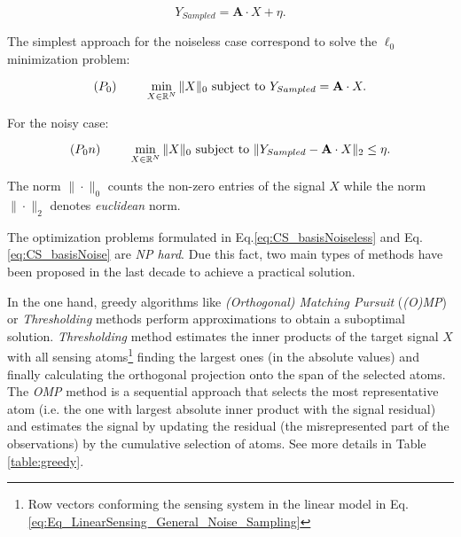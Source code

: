 \begin{equation}
\label{eq:Eq_LinearSensing_General_Noise_Sampling}
	Y_{Sampled} = \mathbf{A} \cdot X +  \eta .
\end{equation}

The simplest approach for the noiseless case correspond to solve the $\ell_0$ minimization problem: 

\begin{equation}
(P_0) \hspace{0.8cm} \min_{X \in \mathbb{R}^{N}} \|X\|_0 \mbox{ subject to } Y_{Sampled} = \mathbf{A} \cdot X .
\label{eq:CS_basisNoiseless}
\end{equation}


For the noisy case: 

\begin{equation}
(P_0n) \hspace{0.8cm} \min_{X \in \mathbb{R}^{N}} \|X\|_0 \mbox{ subject to } \|Y_{Sampled}-\mathbf{A} \cdot X\|_2\leq \eta .
\label{eq:CS_basisNoise}
\end{equation}

The norm $\|\cdot\|_0$ counts the non-zero entries of the signal $X$ while the norm $\|\cdot\|_2$ denotes \emph{euclidean} norm.

The optimization problems formulated in Eq.\eqref{eq:CS_basisNoiseless} and Eq.\eqref{eq:CS_basisNoise} are \emph{NP hard}. Due this fact, two main types of methods have been proposed in the last decade to achieve a practical solution.

In the one hand, greedy algorithms like \emph{(Orthogonal) Matching Pursuit} (\emph{(O)MP}) or \emph{Thresholding} methods perform approximations to obtain a suboptimal solution. \emph{Thresholding} method estimates the inner products of the target signal $X$ with all sensing atoms\footnote{Row vectors conforming the sensing system in the linear model in Eq.\eqref{eq:Eq_LinearSensing_General_Noise_Sampling}} finding the largest ones (in the absolute values) and finally calculating the orthogonal projection onto the span of the selected atoms. The \emph{OMP} method is a sequential approach that selects the most representative atom (i.e. the one with largest absolute inner product with the signal residual) and estimates the signal by updating the residual (the misrepresented part of the observations) by the cumulative selection of atoms. See more details in Table \ref{table:greedy}.

